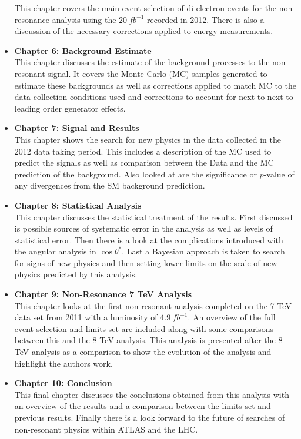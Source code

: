 \begin{itemize}
{This chapter covers the main event selection of di-electron events for the non-resonance analysis using the $20~fb^{-1}$ recorded in 2012. There is also a discussion of the necessary corrections applied to energy measurements.
}
\item{ 
{\bf Chapter 6: Background Estimate} \\
This chapter discusses the estimate of the background processes to the non-resonant signal. It covers the Monte Carlo (MC) samples generated to estimate these backgrounds as well as corrections applied to match MC to the data collection conditions used and corrections to account for next to next to leading order generator effects.
}
\item{ 
{\bf Chapter 7: Signal and Results} \\
This chapter shows the search for new physics in the data collected in the 2012 data taking period. This includes a description of the MC used to predict the signals as well as comparison between the Data and the MC prediction of the background. Also looked at are the significance or $p$-value of any divergences from the SM background prediction.
}
\item{ 
{\bf Chapter 8: Statistical Analysis} \\
This chapter discusses the statistical treatment of the results. First discussed is possible sources of systematic error in the analysis as well as levels of statistical error. Then there is a look at the complications introduced with the angular analysis in $\cos\theta^{*}$. Last a Bayesian approach is taken to search for signs of new physics and then setting lower limits on the scale of new physics predicted by this analysis.
}
\item{ 
{\bf Chapter 9: Non-Resonance 7 TeV Analysis} \\
This chapter looks at the first non-resonant analysis completed on the 7 TeV data set from 2011 with a luminosity of $4.9~fb^{-1}$. An overview of the full event selection and limits set are included along with some comparisons between this and the 8 TeV analysis. This analysis is presented after the 8 TeV analysis as a comparison to show the evolution of the analysis and highlight the authors work.
}
\item{ 
{\bf Chapter 10: Conclusion} \\
This final chapter discusses the conclusions obtained from this analysis with an overview of the results and a comparison between the limits set and previous results. Finally there is a look forward to the future of searches of non-resonant physics within ATLAS and the LHC.
}
\end{itemize}






